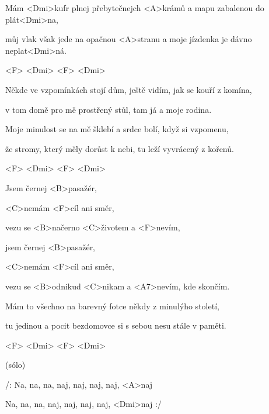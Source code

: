 

\zs
Mám <Dmi>kufr plnej přebytečnejch <A>krámů a mapu zabalenou do plát<Dmi>na,

můj vlak však jede na opačnou <A>stranu a moje jízdenka je dávno neplat<Dmi>ná.
\ks

<F> <Dmi> <F> <Dmi>

\zs
Někde ve vzpomínkách stojí dům, ještě vidím, jak se kouří z komína,

v tom domě pro mě prostřený stůl, tam já a moje rodina.

Moje minulost se na mě šklebí a srdce bolí, když si vzpomenu,

že stromy, který měly dorůst k nebi, tu leží vyvrácený z kořenů.
\ks

<F> <Dmi> <F> <Dmi>

\zr
Jsem černej <B>pasažér,

<C>nemám <F>cíl ani směr,

vezu se <B>načerno <C>životem a <F>nevím,

jsem černej <B>pasažér,

<C>nemám <F>cíl ani směr,

vezu se <B>odnikud <C>nikam a <A7>nevím, kde skončím.
\kr

\zs
Mám to všechno na barevný fotce někdy z minulýho století,

tu jedinou a pocit bezdomovce si s sebou nesu stále v paměti.
\ks

<F> <Dmi> <F> <Dmi>

\zr \kr

\zr(sólo)\kr

\zs

/: Na, na, na, naj, naj, naj, naj, <A>naj

Na, na, na, naj, naj, naj, naj, <Dmi>naj :/
\ks

\kp
